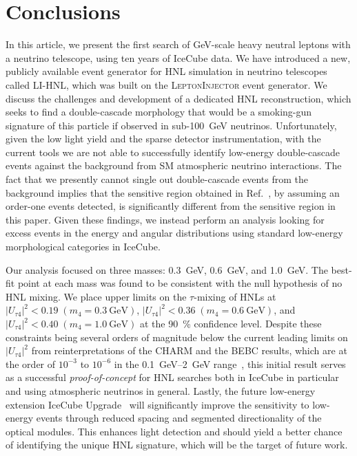 \documentclass[
    aps,
    prd,
    reprint,
    amsmath,
    amssymb,
    nofootinbib,
    superscriptaddress,
    floatfix
]{revtex4-2}
\newcommand{\gev}{\giga\electronvolt}
\def\ut4{$|U_{\tau4}|^2$}
\def\nomathut4{|U_{\tau4}|^2}
\begin{document}

\section{\label{sec:conclusion}Conclusions}

In this article, we present the first search of GeV-scale heavy neutral leptons with a neutrino telescope, using ten years of IceCube data.
We have introduced a new, publicly available event generator for HNL simulation in neutrino telescopes called \textsc{LI-HNL}, which was built on the \textsc{LeptonInjector} event generator.
We discuss the challenges and development of a dedicated HNL reconstruction, which seeks to find a double-cascade morphology that would be a smoking-gun signature of this particle if observed in sub-\SI{100}{\gev} neutrinos.
Unfortunately, given the low light yield and the sparse detector instrumentation, with the current tools we are not able to successfully identify low-energy double-cascade events against the background from SM atmospheric neutrino interactions.
The fact that we presently cannot single out double-cascade events from the background implies that the sensitive region obtained in Ref.~\cite{Coloma:2017ppo}, by assuming an order-one events detected, is significantly different from the sensitive region in this paper.
Given these findings, we instead perform an analysis looking for excess events in the energy and angular distributions using standard low-energy morphological categories in IceCube.

Our analysis focused on three masses: \SI{0.3}{\gev}, \SI{0.6}{\gev}, and \SI{1.0}{\gev}. 
The best-fit point at each mass was found to be consistent with the null hypothesis of no HNL mixing.
We place upper limits on the $\tau$-mixing of HNLs at $\nomathut4 < 0.19\;(m_4 = \SI{0.3}{\gev})$, $\nomathut4 < 0.36\;(m_4 = \SI{0.6}{\gev})$, and $\nomathut4 < 0.40\;(m_4 = \SI{1.0}{\gev})$ at the \SI{90}{\percent} confidence level.
Despite these constraints being several orders of magnitude below the current leading limits on \ut4 from reinterpretations of the CHARM and the BEBC results, which are at the order of $10^{-3}$ to $10^{-6}$ in the \SIrange{0.1}{2}{\gev} range~\cite{Orloff:2002de, Boiarska:2021yho, Barouki:2022bkt}, this initial result serves as a successful \textit{proof-of-concept} for HNL searches both in IceCube in particular and using atmospheric neutrinos in general.
Lastly, the future low-energy extension IceCube Upgrade~\cite{Ishihara:2019aao} will significantly improve the sensitivity to low-energy events through reduced spacing and segmented directionality of the optical modules.
This enhances light detection and should yield a better chance of identifying the unique HNL signature, which will be the target of future work.
\end{document}
